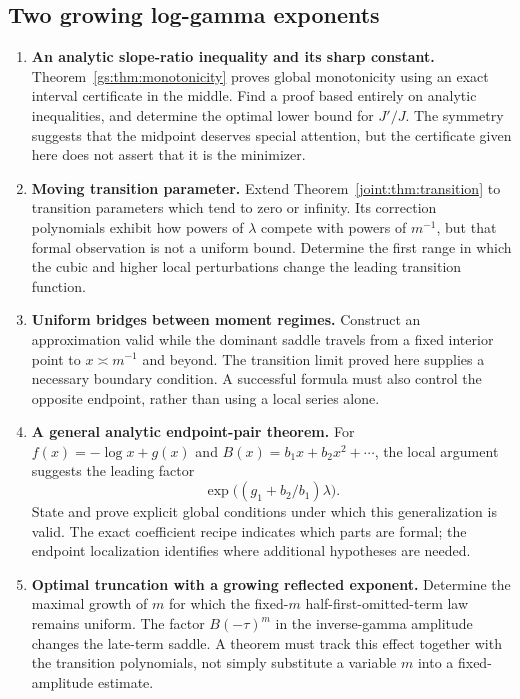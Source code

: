 \subsection{Two growing log-gamma exponents}

\begin{enumerate}[leftmargin=*,label=M\arabic*.]
\item \textbf{An analytic slope-ratio inequality and its sharp
constant.} Theorem~\ref{gs:thm:monotonicity} proves global
monotonicity using an exact interval certificate in the middle.
Find a proof based entirely on analytic inequalities, and determine
the optimal lower bound for $J'/J$. The symmetry suggests that
the midpoint deserves special attention, but the certificate given
here does not assert that it is the minimizer.

\item \textbf{Moving transition parameter.} Extend
Theorem~\ref{joint:thm:transition} to transition parameters which
tend to zero or infinity. Its correction polynomials exhibit
how powers of $\lambda$ compete with powers of $m^{-1}$, but
that formal observation is not a uniform bound. Determine the
first range in which the cubic and higher local perturbations
change the leading transition function.

\item \textbf{Uniform bridges between moment regimes.}
Construct an approximation valid while the dominant saddle
travels from a fixed interior point to $x\asymp m^{-1}$ and
beyond. The transition limit proved here supplies a necessary
boundary condition. A successful formula must also control the
opposite endpoint, rather than using a local series alone.

\item \textbf{A general analytic endpoint-pair theorem.}
For $f(x)=-\log x+g(x)$ and
$B(x)=b_1x+b_2x^2+\cdots$, the local argument suggests the
leading factor
\[
 \exp\bigl((g_1+b_2/b_1)\lambda\bigr).
\]
State and prove explicit global conditions under which this
generalization is valid. The exact coefficient recipe indicates
which parts are formal; the endpoint localization identifies
where additional hypotheses are needed.

\item \textbf{Optimal truncation with a growing reflected
exponent.} Determine the maximal growth of $m$ for which the
fixed-$m$ half-first-omitted-term law remains uniform. The factor
$B(-\tau)^m$ in the inverse-gamma amplitude changes the late-term
saddle. A theorem must track this effect together with the
transition polynomials, not simply substitute a variable $m$
into a fixed-amplitude estimate.
\end{enumerate}

